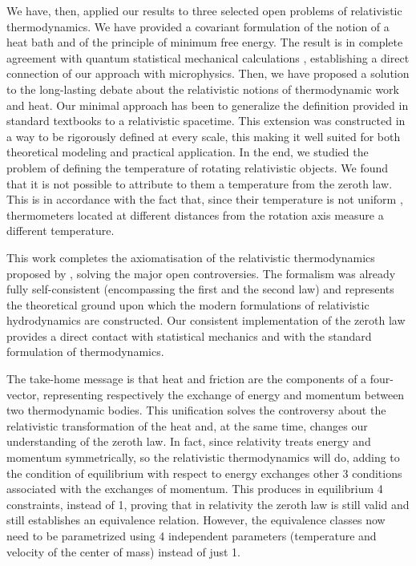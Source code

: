 \documentclass[twocolumn,usenatbib]{mnras2}
\begin{document}
We have, then, applied our results to three selected open problems of relativistic thermodynamics. We have provided a covariant formulation of the notion of a heat bath and of the principle of minimum free energy. The result is in complete agreement with quantum statistical mechanical calculations \citep{Sewell2008}, establishing a direct connection of our approach with microphysics. Then, we have proposed a solution to the long-lasting debate about the relativistic notions of thermodynamic work and heat. Our minimal approach has been to generalize the definition provided in standard textbooks \citep{landau5} to a relativistic spacetime. This extension was constructed in a way to be rigorously defined at every scale, this making it well suited for both theoretical modeling and practical application. In the end, we studied the problem of defining the temperature of rotating relativistic objects. We found that it is not possible to attribute to them a temperature from the zeroth law. This is in accordance with the fact that, since their temperature is not uniform \citep{cercignani_book}, thermometers located at different distances from the rotation axis measure a different temperature.


This work completes the axiomatisation of the relativistic thermodynamics proposed by \cite{Noto_full,Israel2009_book}, solving the major open controversies. The formalism was already fully self-consistent (encompassing the first and the second law) and represents the theoretical ground upon which the modern formulations of relativistic hydrodynamics are constructed. Our consistent implementation of the zeroth law provides a direct contact with statistical mechanics and with the standard formulation of thermodynamics.

The take-home message is that heat and friction are the components of a four-vector, representing respectively the exchange of energy and momentum between two thermodynamic bodies. This unification solves the controversy about the relativistic transformation of the heat and, at the same time, changes our understanding of the zeroth law. In fact, since relativity treats energy and momentum symmetrically, so the relativistic thermodynamics will do, adding to the condition of equilibrium with respect to energy exchanges other 3 conditions associated with the exchanges of momentum. This produces in equilibrium 4 constraints, instead of 1, proving that in relativity the zeroth law is still valid and still establishes an equivalence relation. However, the equivalence classes now need to be parametrized using 4 independent parameters (temperature and velocity of the center of mass) instead of just 1.
\end{document}
